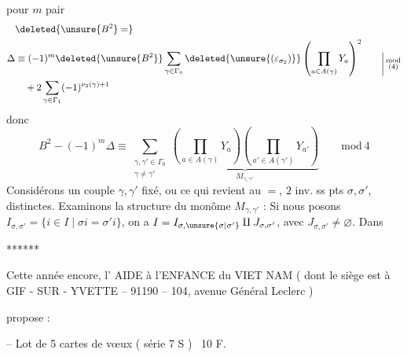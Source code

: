 
   pour $m$ pair
\[
\begin{aligned}
&\deleted{\unsure{B^2}=}\\
\Delta&\equiv(-1)^m\deleted{\unsure{B^2}}\sum_{\gamma\in\Gamma_0}
\deleted{\unsure{(\varepsilon_{\sigma_2})}}\left(\prod_{a\in A(\gamma)}Y_a\right)^2\\
&\quad+2\sum_{\gamma\in\Gamma_1}(-1)^{\nu_2(\gamma)+1}
\end{aligned}
\qquad\bigg|\,\substack{\mathrm{mod}\\(4)}
\]
donc
\[
B^2-(-1)^m\Delta\equiv\sum_{\substack{\gamma,\gamma'\in\Gamma_0\\\gamma\ne\gamma'}}
\underbrace{\left(\prod_{a\in A(\gamma)}Y_a\right)\!\left(\prod_{a'\in A(\gamma')}Y_{a'}\right)}_{M_{\gamma,\gamma'}}
\qquad\mathrm{mod}\ 4
\]
Considérons un couple $\gamma,\gamma'$ fixé, ou ce qui revient au $=$, $2$ inv. ss pts   $\sigma,\sigma'$, distinctes.  Examinons la structure du monôme $M_{\gamma,\gamma'}$ : Si nous posons $I_{\sigma,\sigma'}=\{i\in I\mid\sigma i=\sigma'i\}$, on a $I=I_{\sigma,\unsure{\sigma|\sigma'}}\amalg J_{\sigma,\sigma'}$, avec $J_{\sigma,\sigma'}\ne\varnothing$. Dans
\begin{center}
\end{center}

\begin{center}******\end{center}

Cette année encore, l' AIDE à l'ENFANCE du VIET NAM ( dont le siège est à GIF - SUR - YVETTE -- 91190 -- 104, avenue Général Leclerc )

propose :

-- Lot de 5 cartes de vœux ( série 7 S ) \dotfill\ 10 F.

